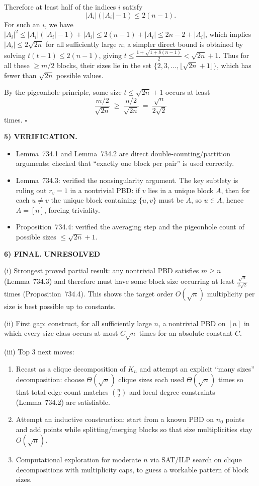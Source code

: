 Therefore at least half of the indices $i$ satisfy
\[
|A_i|(|A_i|-1)\le 2(n-1).
\]
For such an $i$, we have $|A_i|^2\le |A_i|(|A_i|-1)+|A_i|\le 2(n-1)+|A_i|\le 2n-2+|A_i|$, which implies $|A_i|\le 2\sqrt{2n}$ for all sufficiently large $n$; a simpler direct bound is obtained by solving $t(t-1)\le 2(n-1)$, giving $t\le \frac{1+\sqrt{1+8(n-1)}}{2}<\sqrt{2n}+1$.
Thus for all these $\ge m/2$ blocks, their sizes lie in the set $\{2,3,\dots,\lfloor \sqrt{2n}+1\rfloor\}$, which has fewer than $\sqrt{2n}$ possible values.

By the pigeonhole principle, some size $t\le \sqrt{2n}+1$ occurs at least
\[
\frac{m/2}{\sqrt{2n}}\ \ge\ \frac{n/2}{\sqrt{2n}}\ =\ \frac{\sqrt n}{2\sqrt 2}
\]
 times. \hfill $\square$

\medskip
\noindent\textbf{5) VERIFICATION.}

\begin{itemize}
\item Lemma~734.1 and Lemma~734.2 are direct double-counting/partition arguments; checked that ``exactly one block per pair'' is used correctly.
\item Lemma~734.3: verified the nonsingularity argument. The key subtlety is ruling out $r_v=1$ in a nontrivial PBD: if $v$ lies in a unique block $A$, then for each $u\neq v$ the unique block containing $\{u,v\}$ must be $A$, so $u\in A$, hence $A=[n]$, forcing triviality.
\item Proposition~734.4: verified the averaging step and the pigeonhole count of possible sizes $\le \sqrt{2n}+1$.
\end{itemize}

\medskip
\noindent\textbf{6) FINAL.} \textbf{UNRESOLVED}

(i) Strongest proved partial result: any nontrivial PBD satisfies $m\ge n$ (Lemma~734.3) and therefore must have some block size occurring at least $\frac{\sqrt n}{2\sqrt2}$ times (Proposition~734.4). This shows the target order $O(\sqrt n)$ multiplicity per size is best possible up to constants.

(ii) First gap: construct, for all sufficiently large $n$, a nontrivial PBD on $[n]$ in which every size class occurs at most $C\sqrt n$ times for an absolute constant $C$.

(iii) Top 3 next moves:
\begin{enumerate}
\item Recast as a clique decomposition of $K_n$ and attempt an explicit ``many sizes'' decomposition: choose $\Theta(\sqrt n)$ clique sizes each used $\Theta(\sqrt n)$ times so that total edge count matches $\binom{n}{2}$ and local degree constraints (Lemma~734.2) are satisfiable.
\item Attempt an inductive construction: start from a known PBD on $n_0$ points and add points while splitting/merging blocks so that size multiplicities stay $O(\sqrt n)$.
\item Computational exploration for moderate $n$ via SAT/ILP search on clique decompositions with multiplicity caps, to guess a workable pattern of block sizes.
\end{enumerate}

